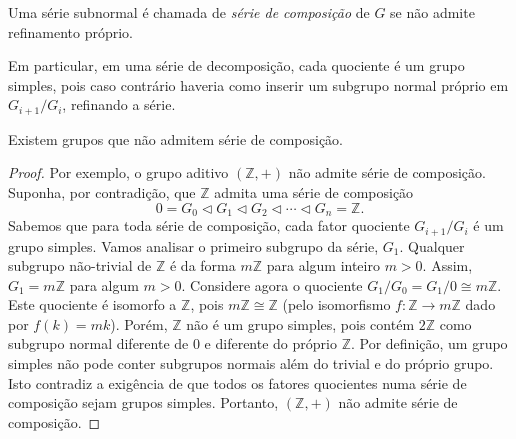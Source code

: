 \documentclass[11pt,openany]{book}
\begin{document}
\begin{definition}
\label{def:serie_decomposicao}
        Uma série subnormal é chamada de \textit{série de composição} de $G$ se não admite refinamento próprio.
        
        Em particular, em uma série de decomposição, cada quociente é um grupo simples, pois caso contrário haveria como inserir um subgrupo normal próprio em $G_{i+1}/G_i$, refinando a série.
\end{definition}

\begin{proposition}
\label{prop:nem_todo_grupo_admite_serie_decomposicao}
    Existem grupos que não admitem série de composição.
\end{proposition}
\begin{proof}
        Por exemplo, o grupo aditivo $(\mathbb{Z}, +)$ não admite série de composição. Suponha, por contradição, que $\mathbb{Z}$ admita uma série de composição
        \[{0} = G_0 \triangleleft G_1 \triangleleft G_2 \triangleleft \cdots \triangleleft G_n = \mathbb{Z}.\]
        Sabemos que para toda série de composição, cada fator quociente $G_{i+1}/G_i$ é um grupo simples. Vamos analisar o primeiro subgrupo da série, $G_1$.
        Qualquer subgrupo não-trivial de $\mathbb{Z}$ é da forma $m\mathbb{Z}$ para algum inteiro $m > 0$. Assim, $G_1 = m\mathbb{Z}$ para algum $m > 0$.
        Considere agora o quociente $G_1/G_0 = G_1/{0} \cong m\mathbb{Z}$. Este quociente é isomorfo a $\mathbb{Z}$, pois $m\mathbb{Z} \cong \mathbb{Z}$ (pelo isomorfismo $f: \mathbb{Z} \to m\mathbb{Z}$ dado por $f(k) = mk$).
        Porém, $\mathbb{Z}$ não é um grupo simples, pois contém $2\mathbb{Z}$ como subgrupo normal diferente de ${0}$ e diferente do próprio $\mathbb{Z}$. Por definição, um grupo simples não pode conter subgrupos normais além do trivial e do próprio grupo.
        Isto contradiz a exigência de que todos os fatores quocientes numa série de composição sejam grupos simples.
        Portanto, $(\mathbb{Z}, +)$ não admite série de composição.
\end{proof}
\end{document}
